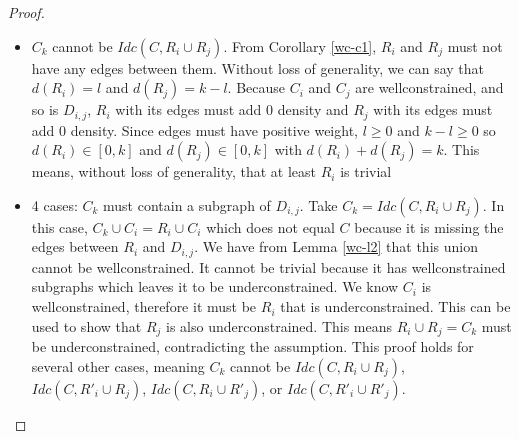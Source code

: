 \documentclass[11pt]{article}
\begin{document}
\begin{proof}
\begin{itemize}
    \item $C_k$ cannot be $Idc(C,R_i\cup R_j)$. From Corollary \ref{wc-c1}, $R_i$ and $R_j$ must not have any edges between them. Without loss of generality, we can say that $d(R_i)=l$ and $d(R_j)=k-l$. Because $C_i$ and $C_j$ are wellconstrained, and so is $D_{i,j}$, $R_i$ with its edges must add 0 density and $R_j$ with its edges must add 0 density. Since edges must have positive weight, $l\geq 0$ and $k-l\geq 0$ so $d(R_i)\in [0,k]$ and $d(R_j)\in [0,k]$ with $d(R_i)+d(R_j)=k$. This means, without loss of generality, that at least $R_i$ is trivial
    \item 4 cases: $C_k$ must contain a subgraph of $D_{i,j}$. Take $C_k=Idc(C,R_i\cup R_j)$. In this case, $C_k\cup C_i = R_i\cup C_i$ which does not equal $C$ because it is missing the edges between $R_i$ and $D_{i,j}$. We have from Lemma \ref{wc-l2} that this union cannot be wellconstrained. It cannot be trivial because it has wellconstrained subgraphs which leaves it to be underconstrained. We know $C_i$ is wellconstrained, therefore it must be $R_i$ that is underconstrained. This can be used to show that $R_j$ is also underconstrained. This means $R_i\cup R_j=C_k$ must be underconstrained, contradicting the assumption. This proof holds for several other cases, meaning $C_k$ cannot be $Idc(C,R_i\cup R_j)$, $Idc(C,R'_i\cup R_j)$, $Idc(C,R_i\cup R'_j)$, or $Idc(C,R'_i\cup R'_j)$.

\end{itemize}
\end{proof}
\end{document}
